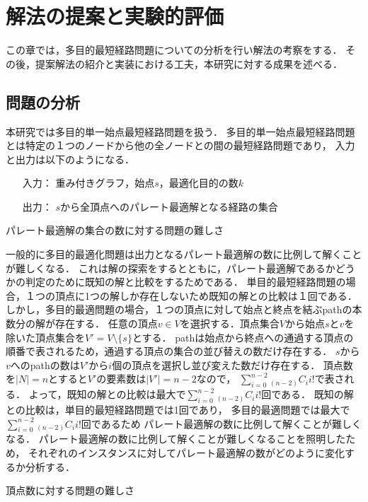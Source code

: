 \documentclass[12pt]{optlab-bachelor}
\begin{document}
\chapter{解法の提案と実験的評価}
この章では，多目的最短経路問題についての分析を行い解法の考察をする．
その後，提案解法の紹介と実装における工夫，本研究に対する成果を述べる．

\section{問題の分析}
本研究では多目的単一始点最短経路問題を扱う．
多目的単一始点最短経路問題とは特定の１つのノードから他の全ノードとの間の最短経路問題であり，
入力と出力は以下のようになる．
\begin{itemize}
  \item[入力：]重み付きグラフ，始点$s$，最適化目的の数$k$
  \item[出力：]$s$から全頂点へのパレート最適解となる経路の集合
\end{itemize}

\begin{description}
  \item[パレート最適解の集合の数に対する問題の難しさ]
\end{description}

一般的に多目的最適化問題は出力となるパレート最適解の数に比例して解くことが難しくなる．
これは解の探索をするとともに，パレート最適解であるかどうかの判定のために既知の解と比較をするためである．
単目的最短経路問題の場合，１つの頂点に1つの解しか存在しないため既知の解との比較は１回である．
しかし，多目的最適問題の場合，１つの頂点に対して始点と終点を結ぶpathの本数分の解が存在する．
任意の頂点$v \in V$を選択する．頂点集合$V$から始点$s$と$v$を除いた頂点集合を$V'=V \setminus \{s\}$とする．
pathは始点から終点への通過する頂点の順番で表されるため，通過する頂点の集合の並び替えの数だけ存在する．
$s$から$v$へのpathの数は$V'$から$i$個の頂点を選択し並び変えた数だけ存在する．
頂点数を$|N|=n$とすると$V'$の要素数は$|V'|=n-2$なので，
$\displaystyle \sum_{i=0}^{n-2} {}_{(n-2)}C_i i!$で表される．
よって，既知の解との比較は最大で$\displaystyle \sum_{i=0}^{n-2} {}_{(n-2)}C_i i!$回である．
既知の解との比較は，単目的最短経路問題では1回であり，
多目的最適問題では最大で$\displaystyle \sum_{i=0}^{n-2} {}_{(n-2)}C_i i!$回であるため
パレート最適解の数に比例して解くことが難しくなる．
パレート最適解の数に比例して解くことが難しくなることを照明したため，
それぞれのインスタンスに対してパレート最適解の数がどのように変化するか分析する．

\begin{description}
  \item[頂点数に対する問題の難しさ]
\end{description}
\end{document}
